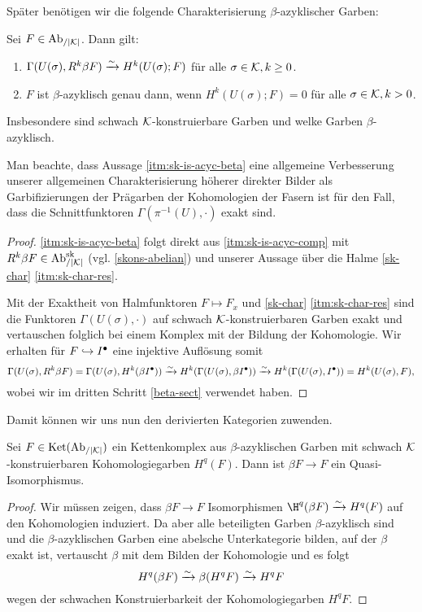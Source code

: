 Später benötigen wir die folgende Charakterisierung
$\beta$-azyklischer Garben:
\begin{prop}[\cite{KS}, 8.1.8] \label{sk-is-acyc}
  Sei $F \in \operatorname{Ab}_{/|\mathcal{K}|}$. Dann gilt:
  \begin{enumerate}[label=(\roman*)]
  \item \label{itm:sk-is-acyc-comp} $\Gamma(U(\sigma), R^k\beta F)
    \xrightarrow[]{\sim} H^k(U(\sigma); F)$ für alle $\sigma \in \mathcal{K}, k \geq 0$.
  \item \label{itm:sk-is-acyc-beta} $F$ ist $\beta$-azyklisch genau dann,
    wenn $H^k(U(\sigma); F) = 0$ für alle $\sigma \in \mathcal{K}, k > 0$.
  \end{enumerate}
  Insbesondere sind schwach $\mathcal{K}$-konstruierbare Garben und welke
  Garben $\beta$-azyklisch.
\end{prop}
\begin{bem}
  Man beachte, dass Aussage \ref{itm:sk-is-acyc-beta} eine allgemeine
  Verbesserung unserer allgemeinen Charakterisierung höherer direkter
  Bilder als Garbifizierungen der Prägarben der Kohomologien der
  Fasern ist für den Fall, dass die Schnittfunktoren
  $\Gamma(\pi^{-1}(U), \cdot)$ exakt sind.
\end{bem}
\begin{proof}
  \ref{itm:sk-is-acyc-beta} folgt direkt aus \ref{itm:sk-is-acyc-comp} mit
  $R^k\beta F \in \operatorname{Ab}_{/|\mathcal{K}|}^{\operatorname{sk}}$ (vgl. \ref{skons-abelian}) und unserer
  Aussage über die Halme \ref{sk-char} \ref{itm:sk-char-res}.
  
  Mit der Exaktheit von Halmfunktoren $F \mapsto F_x$ und
  \ref{sk-char} \ref{itm:sk-char-res} sind die Funktoren
  $\Gamma(U(\sigma), \cdot)$ auf schwach $\mathcal{K}$-konstruierbaren Garben
  exakt und vertauschen folglich bei einem Komplex mit der Bildung der
  Kohomologie. Wir erhalten für $F \hookrightarrow I^{\bullet}$ eine injektive Auflösung
  somit
  \[ \Gamma(U(\sigma), R^k\beta F)
  = \Gamma(U(\sigma), H^k(\beta I^{\bullet}))
  \xrightarrow[]{\sim} H^k(\Gamma(U(\sigma), \beta I^{\bullet}))
  \xrightarrow[]{\sim} H^k(\Gamma(U(\sigma), I^{\bullet}))
  = H^k(U(\sigma), F), \]
  wobei wir im dritten Schritt \ref{beta-sect} verwendet haben.
\end{proof}

Damit können wir uns nun den derivierten Kategorien zuwenden.
\begin{satz} \label{beta-qi}
  Sei $F \in \operatorname{Ket}(\operatorname{Ab}_{/|\mathcal{K}|})$ ein Kettenkomplex aus $\beta$-azyklischen
  Garben mit schwach $\mathcal{K}$-konstruierbaren Kohomologiegarben
  $H^q(F)$. Dann ist $\beta F \to F$ ein Quasi-Isomorphismus.
\end{satz}
\begin{proof}
  Wir müssen zeigen, dass $\beta F \to F$ Isomorphismen $\H^q(\beta F)
  \iso H^q(F)$ auf den Kohomologien induziert. Da aber alle
  beteiligten Garben $\beta$-azyklisch sind und die
  $\beta$-azyklischen Garben eine abelsche Unterkategorie bilden, auf
  der $\beta$ exakt ist, vertauscht $\beta$ mit dem Bilden der
  Kohomologie und es folgt
  \[ H^q(\beta F) \xrightarrow[]{\sim} \beta (H^q F) \xrightarrow[]{\sim} H^q F \]
  wegen der schwachen Konstruierbarkeit der Kohomologiegarben $H^q F$.
\end{proof}

